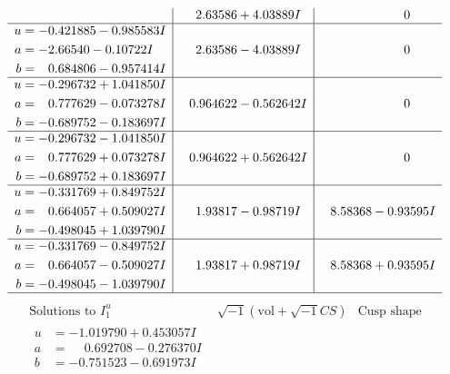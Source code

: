 \documentclass[1p]{elsarticle_modified}
\theoremstyle{definition}
\newcommand{\I}{\sqrt{-1}}
\begin{document}
$$\begin{array}{c|c|c}
 & \phantom{-}2.63586 + 4.03889 I & \phantom{-0.000000 } 0 \\ \hline\begin{aligned}
u &= -0.421885 - 0.985583 I \\
a &= -2.66540 - 0.10722 I \\
b &= \phantom{-}0.684806 - 0.957414 I\end{aligned}
 & \phantom{-}2.63586 - 4.03889 I & \phantom{-0.000000 } 0 \\ \hline\begin{aligned}
u &= -0.296732 + 1.041850 I \\
a &= \phantom{-}0.777629 - 0.073278 I \\
b &= -0.689752 - 0.183697 I\end{aligned}
 & \phantom{-}0.964622 - 0.562642 I & \phantom{-0.000000 } 0 \\ \hline\begin{aligned}
u &= -0.296732 - 1.041850 I \\
a &= \phantom{-}0.777629 + 0.073278 I \\
b &= -0.689752 + 0.183697 I\end{aligned}
 & \phantom{-}0.964622 + 0.562642 I & \phantom{-0.000000 } 0 \\ \hline\begin{aligned}
u &= -0.331769 + 0.849752 I \\
a &= \phantom{-}0.664057 + 0.509027 I \\
b &= -0.498045 + 1.039790 I\end{aligned}
 & \phantom{-}1.93817 - 0.98719 I & \phantom{-}8.58368 - 0.93595 I \\ \hline\begin{aligned}
u &= -0.331769 - 0.849752 I \\
a &= \phantom{-}0.664057 - 0.509027 I \\
b &= -0.498045 - 1.039790 I\end{aligned}
 & \phantom{-}1.93817 + 0.98719 I & \phantom{-}8.58368 + 0.93595 I\\
 \hline 
 \end{array}$$\newpage$$\begin{array}{c|c|c}  
\text{Solutions to }I^u_{1}& \I (\text{vol} + \sqrt{-1}CS) & \text{Cusp shape}\\
 \hline 
\begin{aligned}
u &= -1.019790 + 0.453057 I \\
a &= \phantom{-}0.692708 - 0.276370 I \\
b &= -0.751523 - 0.691973 I\end{aligned}

\end{array}$$
\end{document}
